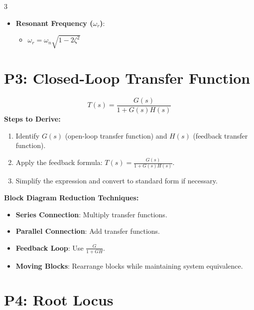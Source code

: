 \documentclass[letterpaper,10pt]{article}
\begin{document}
\begin{multicols}{3}
\begin{itemize}[leftmargin=*]
\begin{itemize}[leftmargin=*]
        \item \textbf{Maximum Overshoot (\(M_p\))}:
        \begin{itemize}[leftmargin=*]
            \item  \( M_p = 0\% \). No overshoot
        \end{itemize}
    \end{itemize}
    
    \item \textbf{Resonant Frequency (\(\omega_r\))}:
    \begin{itemize}[leftmargin=*]
            \item \( \omega_r = \omega_n\sqrt{1-2\zeta^2} \)
    \end{itemize}
\end{itemize}


\section*{P3: Closed-Loop Transfer Function}
\[
T(s) = \frac{G(s)}{1 + G(s)H(s)}
\]
\textbf{Steps to Derive:}
\begin{enumerate}[leftmargin=*]
    \item Identify \( G(s) \) (open-loop transfer function) and \( H(s) \) (feedback transfer function).
    \item Apply the feedback formula: \( T(s) = \frac{G(s)}{1 + G(s)H(s)} \).
    \item Simplify the expression and convert to standard form if necessary.
\end{enumerate}

\noindent
\textbf{Block Diagram Reduction Techniques:}
\begin{itemize}[leftmargin=*]
    \item \textbf{Series Connection}: Multiply transfer functions.
    \item \textbf{Parallel Connection}: Add transfer functions.
    \item \textbf{Feedback Loop}: Use \( \frac{G}{1+GH} \).
    \item \textbf{Moving Blocks}: Rearrange blocks while maintaining system equivalence.
\end{itemize}

\section*{P4: Root Locus}


\end{multicols}
\end{document}
